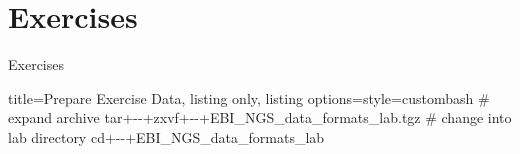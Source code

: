 \documentclass{beamer}
\begin{document}


\section{Exercises}

\begin{frame}[fragile]{Exercises}
\begin{tcblisting}{title={Prepare Exercise Data}, listing only, listing options={style=custombash}}
# expand archive
tar+-\quad -+zxvf+-\quad -+EBI_NGS_data_formats_lab.tgz
# change into lab directory
cd+-\quad -+EBI_NGS_data_formats_lab
\end{tcblisting}
\end{frame}


\end{document}
